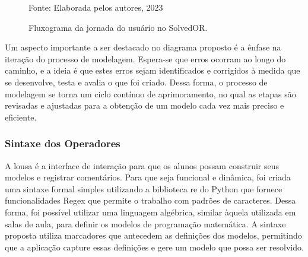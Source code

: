 \documentclass{article}
\providecommand{\fonte}[1]{\par{\footnotesize #1}}
\begin{document}
\begin{figure}[H]
\centering
    \caption{Fluxograma da jornada do usuário no SolvedOR.}
    \fonte{Fonte: Elaborada pelos autores, 2023}
    \label{fig:fluxograma}
\end{figure}

Um aspecto importante a ser destacado no diagrama proposto é a ênfase na iteração do processo de modelagem. Espera-se que erros ocorram ao longo do caminho, e a ideia é que estes erros sejam identificados e corrigidos à medida que se desenvolve, testa e avalia o que foi criado. Dessa forma, o processo de modelagem se torna um ciclo contínuo de aprimoramento, no qual as etapas são revisadas e ajustadas para a obtenção de um modelo cada vez mais preciso e eficiente.

\subsubsection{Sintaxe dos Operadores}
A lousa é a interface de interação para que os alunos possam construir seus modelos e registrar comentários. Para que seja funcional e dinâmica, foi criada uma sintaxe formal simples utilizando a biblioteca re do Python que fornece funcionalidades Regex que permite o trabalho com padrões de caracteres. Dessa forma, foi possível utilizar uma linguagem algébrica, similar àquela utilizada em salas de aula, para definir os modelos de programação matemática. A sintaxe proposta utiliza marcadores que antecedem as definições dos modelos, permitindo que a aplicação capture essas definições e gere um modelo que possa ser resolvido.
\end{document}

